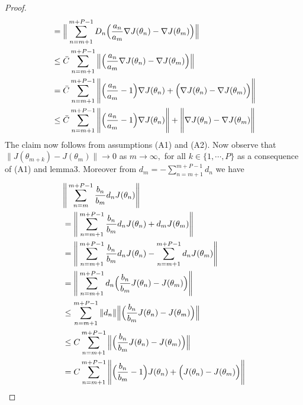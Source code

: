 \begin{lemma}
\begin{proof}
\begin{align*}
  &=\Big{\|}\sum_{n=m+1}^{m+P-1}D_n\Big{(}\frac{a_n}{a_m}\nabla J(\theta_n)
  -\nabla J(\theta_{m})\Big{)}\Big{\|}\\
  &\leq \bar{C}\sum_{n=m+1}^{m+P-1}\Big{\|}\Big{(}\frac{a_n}{a_m}\nabla J(\theta_n)
  -\nabla J(\theta_{m})\Big{)}\Big{\|}\\
  &=\bar{C}\sum_{n=m+1}^{m+P-1}\Bigg{\|}\Big{(}\frac{a_n}{a_m}-1\Big{)}\nabla J(\theta_n)
   +\Big{(}\nabla J(\theta_n)-\nabla J(\theta_{m})\Big{)}\Bigg{\|}\\
  &\leq \bar{C}\sum_{n=m+1}^{m+P-1}\Bigg{\|}\Big{(}\frac{a_n}{a_m}-1\Big{)}\nabla J(\theta_n)\Bigg{\|}
  +\Bigg{\|}\nabla J(\theta_n)-\nabla J(\theta_{m})\Bigg{\|}
 \end{align*}
 The claim now follows from assumptions (A1) and (A2).
 Now observe that $\|J(\theta_{m+k})-J(\theta_{m})\|\rightarrow 0$ as $m\rightarrow \infty,$
 for all $k \in \{1,\cdots,P\}$ as a consequence of (A1)
 and lemma3. Moreover from $d_m=-\sum_{n=m+1}^{m+P-1}d_n$ we have
\begin{align*}
  & \Bigg{\|}\sum_{n=m}^{m+P-1}\frac{b_n}{b_m}d_n J(\theta_n)\Bigg{\|}\\
  & =\Bigg{\|}\sum_{n=m+1}^{m+P-1}\frac{b_n}{b_m}d_n J(\theta_n)+d_m J(\theta_{m})\Bigg{\|}\\
  & =\Bigg{\|}\sum_{n=m+1}^{m+P-1}\frac{b_n}{b_m}d_n J(\theta_n)-\sum_{n=m+1}^{m+P-1}d_n J(\theta_{m})\Bigg{\|}\\
  & =\Bigg{\|}\sum_{n=m+1}^{m+P-1}d_n\Big{(}\frac{b_n}{b_m}J(\theta_n)-J(\theta_{m})\Big{)}\Bigg{\|}\\
  & \leq \sum_{n=m+1}^{m+P-1}\|d_n\|\Big{\|}\Big{(}\frac{b_n}{b_m}J(\theta_n)-J(\theta_{m})\Big{)}\Big{\|}\\
  & \leq C \sum_{n=m+1}^{m+P-1}\Big{\|}\Big{(}\frac{b_n}{b_m}J(\theta_n)-J(\theta_{m})\Big{)}\Big{\|}\\
  & = C \sum_{n=m+1}^{m+P-1} \Bigg{\|}\Big{(}\frac{b_n}{b_m}-1\Big{)} J(\theta_n)
  +\Big{(} J(\theta_n)-J(\theta_{m})\Big{)}\Bigg{\|}\\

\end{align*}
\end{proof}
\end{lemma}
